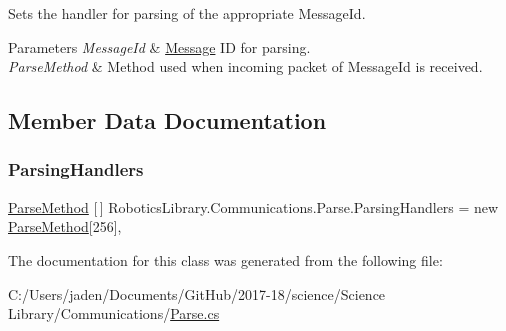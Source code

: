 Sets the handler for parsing of the appropriate Message\+Id. 


\begin{DoxyParams}{Parameters}
{\em Message\+Id} & \hyperlink{class_robotics_library_1_1_communications_1_1_message}{Message} ID for parsing.\\
\hline
{\em Parse\+Method} & Method used when incoming packet of {\ttfamily Message\+Id} is received.\\
\hline
\end{DoxyParams}


\subsection{Member Data Documentation}
\mbox{\label{class_robotics_library_1_1_communications_1_1_parse_aa2e45508e6d9222047bfbec487628c87}} 
\subsubsection{\texorpdfstring{Parsing\+Handlers}{ParsingHandlers}}
{\footnotesize\ttfamily \hyperlink{class_robotics_library_1_1_communications_1_1_parse_a592095b5638ced6eacabbce7acdb5e75}{Parse\+Method} \mbox{[}$\,$\mbox{]} Robotics\+Library.\+Communications.\+Parse.\+Parsing\+Handlers = new \hyperlink{class_robotics_library_1_1_communications_1_1_parse_a592095b5638ced6eacabbce7acdb5e75}{Parse\+Method}\mbox{[}256\mbox{]}\hspace{0.3cm}{\ttfamily [static]}, {\ttfamily [private]}}



The documentation for this class was generated from the following file\+:\begin{DoxyCompactItemize}
\item 
C\+:/\+Users/jaden/\+Documents/\+Git\+Hub/2017-\/18/science/\+Science Library/\+Communications/\hyperlink{_parse_8cs}{Parse.\+cs}\end{DoxyCompactItemize}
